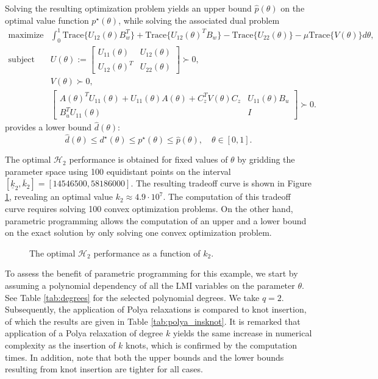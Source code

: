 \documentclass{article}
\newcommand{\opt}{\star}                    %
\newcommand{\ppar}{\theta}                          %
\newcommand{\Htwo}{\mathcal{H}_2}
\begin{document}
Solving the resulting optimization problem yields an upper bound $\hat{p}(\ppar)$ on the optimal value function $p^\opt(\ppar)$, while solving the associated dual problem
\begin{eqnarray*}
 \text{maximize} & \int_0^1 \text{Trace}\{U_{12}(\ppar)B_w^T\} + \text{Trace}\{U_{12}(\ppar)^T B_w\} - \text{Trace}\{U_{22}(\ppar)\} - \mu \text{Trace}\{V(\ppar)\}d\ppar, \\
 \text{subject to} & U(\ppar) := \left[ \begin{array}{cc} U_{11}(\ppar) & U_{12}(\ppar) \\ U_{12}(\ppar)^T & U_{22}(\ppar) \end{array} \right] \succ 0, \\
 & V(\ppar) \succ 0, \\
 & \left[ \begin{array}{cc} A(\ppar)^T U_{11}(\ppar) + U_{11}(\ppar)A(\ppar) + C_z^T V(\ppar) C_z & U_{11}(\ppar)B_u \\ B_u^T U_{11}(\ppar) & I \end{array} \right] \succ 0.
\end{eqnarray*}
provides a lower bound $\hat{d}(\ppar)$:
\begin{equation*}
 \hat{d}(\ppar) \leq d^{\opt}(\ppar) \leq p^{\opt}(\ppar) \leq \hat{p}(\ppar), \quad \ppar \in [0,1].
\end{equation*}

The optimal $\Htwo$ performance is obtained for fixed values of $\ppar$ by gridding the parameter space using 100 equidistant points on the interval $[ \underline{k}_2,\overline{k}_2] = [14546500,58186000]$. The resulting tradeoff curve is shown in Figure \ref{fig:sampled}, revealing an optimal value $k_2 \approx 4.9 \cdot 10^7$. The computation of this tradeoff curve requires solving 100 convex optimization problems. On the other hand, parametric programming allows the computation of an upper and a lower bound on the exact solution by only solving one convex optimization problem.

\begin{figure}
\centering

\caption{The optimal $\Htwo$ performance as a function of $k_2$.}
\label{fig:sampled}
\end{figure}

To assess the benefit of parametric programming for this example, we start by assuming a polynomial dependency of all the LMI variables on the parameter $\ppar$. See Table \ref{tab:degrees} for the selected polynomial degrees. We take $q = 2$. Subsequently, the application of Polya relaxations is compared to knot insertion, of which the results are given in Table \ref{tab:polya_insknot}. It is remarked that application of a Polya relaxation of degree $k$ yields the same increase in numerical complexity as the insertion of $k$ knots, which is confirmed by the computation times. In addition, note that both the upper bounds and the lower bounds resulting from knot insertion are tighter for all cases.
\end{document}
